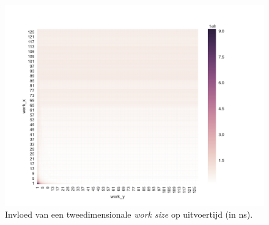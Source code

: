 \documentclass[twocolumn, a4paper]{article}
\begin{document}
\begin{figure}
    \centering
    \includegraphics[width=1.1\textwidth]{data/output_powers.pdf}
    \caption{Invloed van een tweedimensionale \emph{work size} op uitvoertijd (in ns).}\label{fig:output-all}
\end{figure}

\onecolumn

\appendix




\newpage

\end{document}
